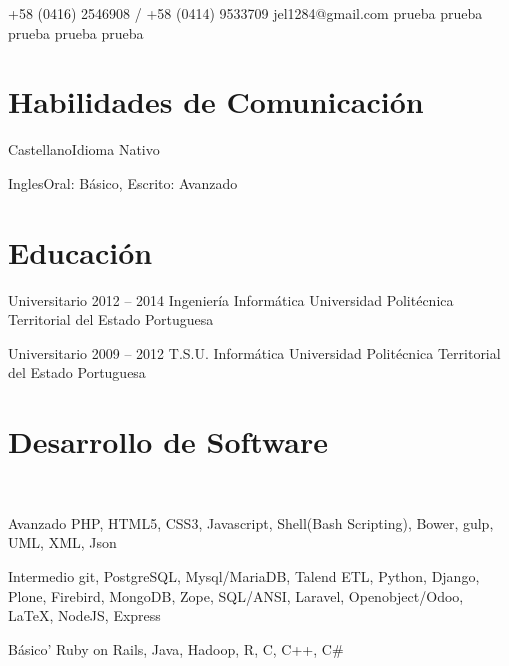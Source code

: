 \documentclass{tccv}
\begin{document}
    {+58 (0416) 2546908 / +58 (0414) 9533709}
    {jel1284@gmail.com}
    {prueba}
    {prueba}
    {prueba}
    {prueba}
    {prueba}


\section{Habilidades de Comunicaci\'on}

\begin{idiomas}
\item{Castellano}{Idioma Nativo}
\item{Ingles}{Oral: B\'asico, Escrito: Avanzado}
\end{idiomas}
\section{Educaci\'on}

\begin{estudios}

\item[Universitario]{2012 -- 2014}
     {Ingenier\'ia Inform\'atica}
     {Universidad Polit\'ecnica Territorial del Estado Portuguesa}

\item[Universitario]{2009 -- 2012}
     {T.S.U. Inform\'atica}
     {Universidad Polit\'ecnica Territorial del Estado Portuguesa}

\end{estudios}

\section{Desarrollo de Software }

\begin{software}
\\
\item{Avanzado}
     {PHP, HTML5, CSS3, Javascript, Shell(Bash Scripting), Bower, gulp, UML, XML, Json} \\
\item{Intermedio}
     {git, PostgreSQL, Mysql/MariaDB, Talend ETL, Python, Django, Plone, Firebird, MongoDB, Zope, SQL/ANSI, Laravel, Openobject/Odoo, \LaTeX, NodeJS, Express } \\
\item{B\'asico'}
     {Ruby on Rails, Java, Hadoop, R, C, C++, C\#}

\end{software}
\end{document}
